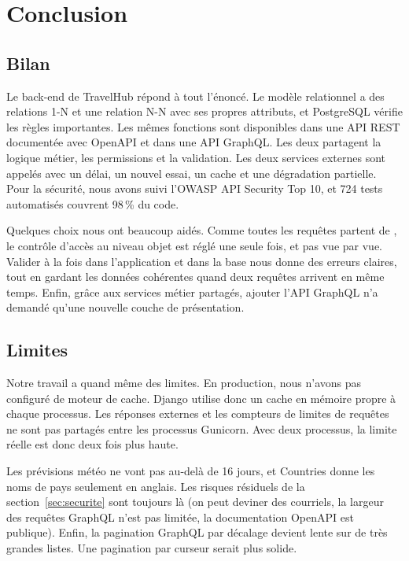 \section{Conclusion}
\label{sec:conclusion}

\subsection{Bilan}

Le back-end de TravelHub répond à tout l'énoncé. Le modèle relationnel a des relations 1-N et une relation N-N avec ses propres attributs, et PostgreSQL vérifie les règles importantes. Les mêmes fonctions sont disponibles dans une API REST documentée avec OpenAPI et dans une API GraphQL. Les deux partagent la logique métier, les permissions et la validation. Les deux services externes sont appelés avec un délai, un nouvel essai, un cache et une dégradation partielle. Pour la sécurité, nous avons suivi l'OWASP API Security Top 10, et 724 tests automatisés couvrent 98\,\% du code.

Quelques choix nous ont beaucoup aidés. Comme toutes les requêtes partent de , le contrôle d'accès au niveau objet est réglé une seule fois, et pas vue par vue. Valider à la fois dans l'application et dans la base nous donne des erreurs claires, tout en gardant les données cohérentes quand deux requêtes arrivent en même temps. Enfin, grâce aux services métier partagés, ajouter l'API GraphQL n'a demandé qu'une nouvelle couche de présentation.

\subsection{Limites}

Notre travail a quand même des limites. En production, nous n'avons pas configuré de moteur de cache. Django utilise donc un cache en mémoire propre à chaque processus. Les réponses externes et les compteurs de limites de requêtes ne sont pas partagés entre les processus Gunicorn. Avec deux processus, la limite réelle est donc deux fois plus haute.

Les prévisions météo ne vont pas au-delà de 16 jours, et Countries donne les noms de pays seulement en anglais. Les risques résiduels de la section~\ref{sec:securite} sont toujours là (on peut deviner des courriels, la largeur des requêtes GraphQL n'est pas limitée, la documentation OpenAPI est publique). Enfin, la pagination GraphQL par décalage devient lente sur de très grandes listes. Une pagination par curseur serait plus solide.

